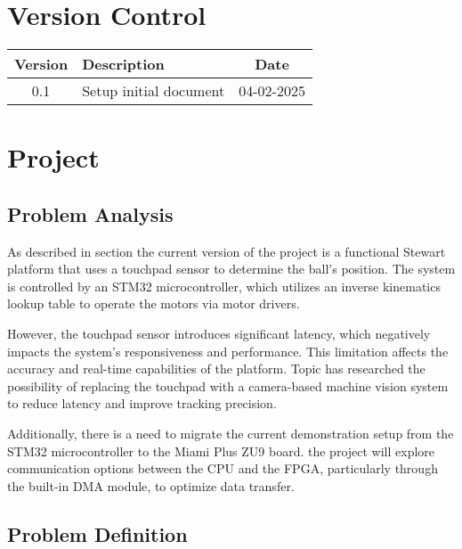 \documentclass{article}
\begin{document}
\newpage

\section*{Version Control}

\begin{tabular}{|c|l|c|}
    \hline
    Version & Description & Date \\
    \hline
    0.1 & Setup initial document & 04-02-2025 \\
    \hline
\end{tabular}

\newpage

\tableofcontents

\newpage

\section{Project}
\subsection{Problem Analysis} As described in section %
the current version of the project is a functional Stewart platform that uses a
touchpad sensor to determine the ball's position. The system is controlled by an
STM32 microcontroller, which utilizes an inverse kinematics lookup table to
operate the motors via motor drivers.

However, the touchpad sensor introduces significant latency, which negatively
impacts the system’s responsiveness and performance. This limitation affects the
accuracy and real-time capabilities of the platform. Topic has researched the
possibility of replacing the touchpad with a camera-based machine vision system
to reduce latency and improve tracking precision.

Additionally, there is a need to migrate the current demonstration setup from
the STM32 microcontroller to the Miami Plus ZU9 board.
the project will explore communication options between the CPU and the FPGA,
particularly through the built-in DMA module, to optimize data transfer.

\subsection{Problem Definition} 
\end{document}
